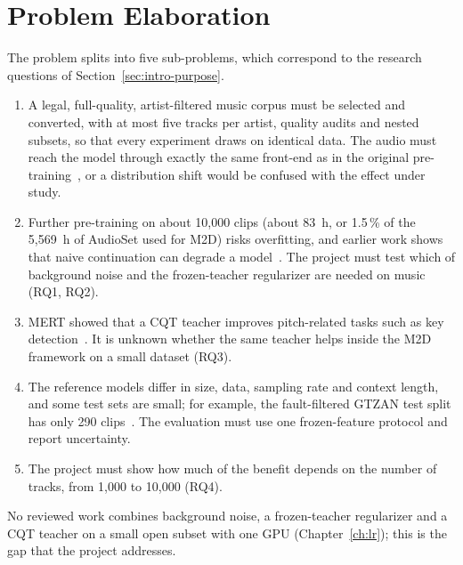 \documentclass{FastFyp}
\begin{document}
\section{Problem Elaboration}
\label{sec:vision-elaboration}
The problem splits into five sub-problems, which correspond to the research questions of Section~\ref{sec:intro-purpose}.
\begin{enumerate}
  \item A legal, full-quality, artist-filtered music corpus must be selected and converted, with at most five tracks per artist, quality audits and nested subsets, so that every experiment draws on identical data. The audio must reach the model through exactly the same front-end as in the original pre-training~\cite{ref:M2DGit}, or a distribution shift would be confused with the effect under study.
  \item Further pre-training on about 10,000 clips (about 83~h, or 1.5\,\% of the 5,569~h of AudioSet used for M2D) risks overfitting, and earlier work shows that naive continuation can degrade a model~\cite{ref:Niizumi:2024m2dx,ref:Zhang:2025sonar}. The project must test which of background noise and the frozen-teacher regularizer are needed on music (RQ1, RQ2).
  \item MERT showed that a CQT teacher improves pitch-related tasks such as key detection~\cite{ref:Li:2024mert}. It is unknown whether the same teacher helps inside the M2D framework on a small dataset (RQ3).
  \item The reference models differ in size, data, sampling rate and context length, and some test sets are small; for example, the fault-filtered GTZAN test split has only 290 clips~\cite{ref:Kereliuk:2015adversaries}. The evaluation must use one frozen-feature protocol and report uncertainty.
  \item The project must show how much of the benefit depends on the number of tracks, from 1,000 to 10,000 (RQ4).
\end{enumerate}
No reviewed work combines background noise, a frozen-teacher regularizer and a CQT teacher on a small open subset with one GPU (Chapter~\ref{ch:lr}); this is the gap that the project addresses.
\end{document}
